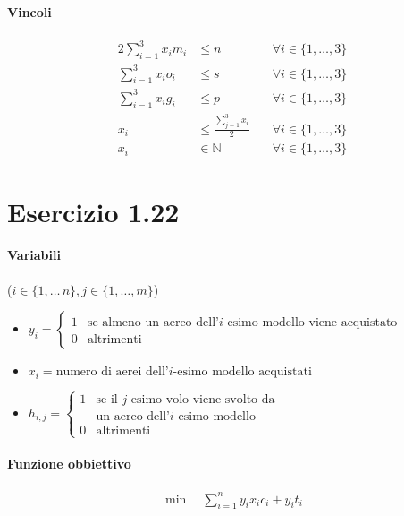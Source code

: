 \documentclass{article}
\begin{document}
\paragraph{Vincoli}
\begin{alignat}{2}
  \sum_{i=1}^3 x_i m_i &\leq n &\forall i \in \{1,\ldots,3\}\\
  \sum_{i=1}^3 x_i o_i &\leq s &\forall i \in \{1,\ldots,3\}\\
  \sum_{i=1}^3 x_i g_i &\leq p &\forall i \in \{1,\ldots,3\}\\
  x_i &\leq \frac{\sum_{j=1}^3 x_i}{2} \quad &\forall i \in \{1,\ldots,3\}\\
  x_i &\in \mathbb{N} \quad &\forall i \in \{1,\ldots,3\}
\end{alignat}

\pagebreak
\section{Esercizio 1.22}

\paragraph{Variabili} ($i \in \{1,\ldots\,n\}, j \in \{1,\ldots,m\}$)
\begin{itemize}
  \item $y_i = \begin{cases}
      1 & \text{se almeno un aereo dell'}i\text{-esimo modello viene acquistato} \\
      0 & \text{altrimenti}
  \end{cases}$
  \item $x_i = \text{numero di aerei dell'}i\text{-esimo modello acquistati}$
  \item $h_{i,j} = \begin{cases}
      1 & \text{se il }j\text{-esimo volo viene svolto da} \\
      & \text{un aereo dell'}i\text{-esimo modello} \\
      0 & \text{altrimenti}
  \end{cases}$
\end{itemize}

\paragraph{Funzione obbiettivo}
\begin{align*}
  \min \quad \sum_{i=1}^n y_i x_i c_i + y_i t_i
\end{align*}
\end{document}
